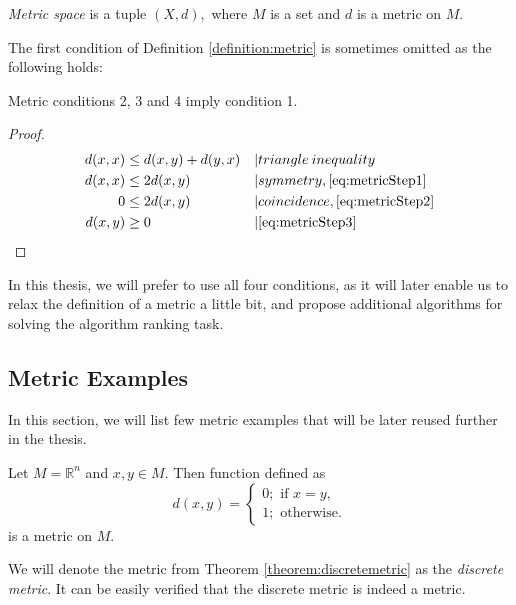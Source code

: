 \begin{definition}
	\emph{Metric space} is a tuple $(X,d),$ where $M$ is a set and $d$ is a metric on $M$.
\end{definition}

The first condition of Definition \ref{definition:metric} is sometimes omitted as the following holds:
\begin{theorem}
	\label{theorem:metricaxiom1redundant}
	Metric conditions 2, 3 and 4 imply condition 1.
	\begin{proof}
		\begin{align}
		d(x,x) &\le d(x,y)+d(y,x) & | & triangle \: inequality \label{eq:metricStep1} \\
		d(x,x) &\le 2d(x,y) & | &  symmetry, \ref{eq:metricStep1} \label{eq:metricStep2}\\
		0 &\le 2d(x,y) & | &  coincidence, \ref{eq:metricStep2} \label{eq:metricStep3} \\
		d(x,y) &\ge 0 & | &  \ref{eq:metricStep3}
		\end{align}
	\end{proof}
\end{theorem}
In this thesis, we will prefer to use all four conditions, as it will later enable us to relax the definition of a metric a little bit, and propose additional algorithms for solving the algorithm ranking task.

\subsection{Metric Examples}
In this section, we will list few metric examples that will be later reused further in the thesis.

\begin{theorem}
	\label{theorem:discretemetric}
	Let $M = \mathbb{R}^n$ and $x,y \in M$. Then function defined as
	\begin{equation}
	d(x,y)=
	\begin{cases}
	0; \text{ if } x = y, \\
	1; \text{ otherwise}.
	\end{cases}
	\end{equation}
	is a metric on $M$.	
\end{theorem}
\begin{definition}
	We will denote the metric from Theorem \ref{theorem:discretemetric} as the \emph{discrete metric}. It can be easily verified that the discrete metric is indeed a metric.
\end{definition}

